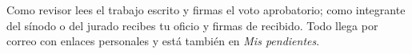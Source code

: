 \documentclass[11pt,a4paper]{article}
\begin{document}
{\small\tableofcontents}
\newpage
\begin{quevasahacer}
Como revisor lees el trabajo escrito y firmas el voto aprobatorio; como integrante del sínodo o del jurado recibes tu oficio y firmas de recibido. Todo llega por correo con enlaces personales y está también en \emph{Mis pendientes}.
\end{quevasahacer}



\end{document}
